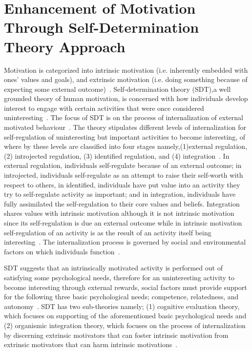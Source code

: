\section{Enhancement of Motivation Through Self-Determination Theory Approach}
Motivation is categorized into intrinsic motivation (i.e. inherently embedded with ones' values and goals), and extrinsic motivation (i.e. doing something because of expecting some external outcome)~\citep{ryan2000intrinsic}. Self-determination theory (SDT)\citep{deci1985:intrinsic},a well grounded theory of human motivation, is concerned with how individuals develop interest to engage with certain activities that were once considered uninteresting~\citep{ryan2000intrinsic}. The focus of SDT is on the process of internalization of external motivated behaviour~\citep{ryan2000intrinsic}. The theory stipulates different levels of internalization for self-regulation of uninteresting but important activities to become interesting, of where by these levels are classified into four stages namely,(1)external regulation, (2) introjected regulation, (3) identified regulation, and (4) integration~\citep{ryan2000intrinsic}. In external regulation, individuals self-regulate because of an external outcome; in introjected, individuals self-regulate as an attempt to raise their self-worth with respect to others, in identified, individuals have put value into an activity they try to self-regulate activity as important; and in integration, individuals have fully assimilated the self-regulation to their core values and beliefs.  Integration shares values with intrinsic motivation although it is not intrinsic motivation since its self-regulation is due an external outcome while in intrinsic motivation self-regulation of an activity is as the result of an activity itself being interesting~\citep{ryan2000intrinsic}. The internalization process is governed by social and environmental factors on which individuals function~\citep{ryan2000:self,lee2015:relating}.

SDT suggests that an intrinsically motivated activity is performed out of satisfying some psychological needs, therefore for an uninteresting activity to become interesting through external rewards, social factors must provide support for the following three basic psychological needs; competence, relatedness, and autonomy~\citep{ryan2000intrinsic}. SDT has two sub-theories namely; (1) cognitive evaluation theory, which focuses on supporting of the aforementioned basic psychological needs and (2) organismic integration theory, which focuses on the process of internalization by discerning extrinsic motivators that can foster intrinsic motivation from extrinsic motivators that can harm intrinsic motivations~\citep{ryan2000:self,lee2015:relating}.

